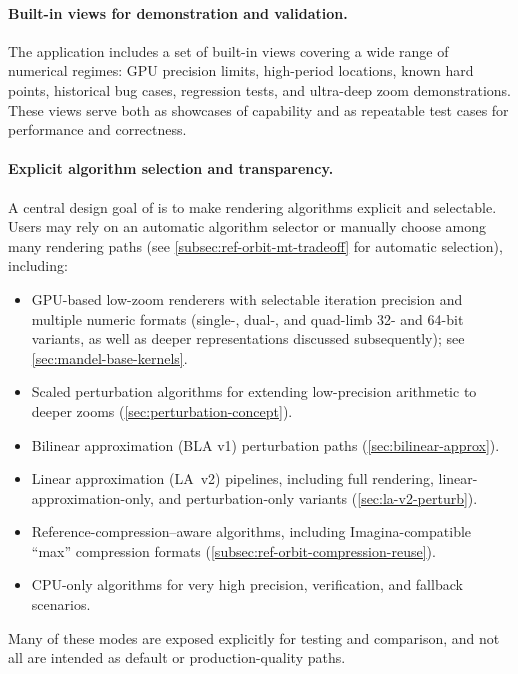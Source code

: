\paragraph{Built-in views for demonstration and validation.}
The application includes a set of built-in views covering a wide
range of numerical regimes: GPU precision limits, high-period locations,
known hard points, historical bug cases, regression tests, and ultra-deep
zoom demonstrations.  These views serve both as showcases of capability and
as repeatable test cases for performance and correctness.

\paragraph{Explicit algorithm selection and transparency.}
A central design goal of \FractalShark{} is to make rendering algorithms
explicit and selectable.  Users may rely on an automatic algorithm selector
or manually choose among many rendering paths (see \cref{subsec:ref-orbit-mt-tradeoff} for automatic selection), including:
\begin{itemize}
  \item GPU-based low-zoom renderers with selectable iteration precision and
        multiple numeric formats (single-, dual-, and quad-limb 32- and 64-bit
        variants, as well as deeper representations discussed subsequently);
        see \cref{sec:mandel-base-kernels}.
  \item Scaled perturbation algorithms for extending low-precision arithmetic
        to deeper zooms (\cref{sec:perturbation-concept}).
  \item Bilinear approximation (BLA v1) perturbation paths (\cref{sec:bilinear-approx}).
  \item Linear approximation (LA~v2) pipelines, including full rendering,
        linear-approximation-only, and perturbation-only variants
        (\cref{sec:la-v2-perturb}).
  \item Reference-compression–aware algorithms, including Imagina-compatible
        ``max'' compression formats (\cref{subsec:ref-orbit-compression-reuse}).
  \item CPU-only algorithms for very high precision, verification, and
        fallback scenarios.
\end{itemize}

Many of these modes are exposed explicitly for testing and comparison, and
not all are intended as default or production-quality paths.

